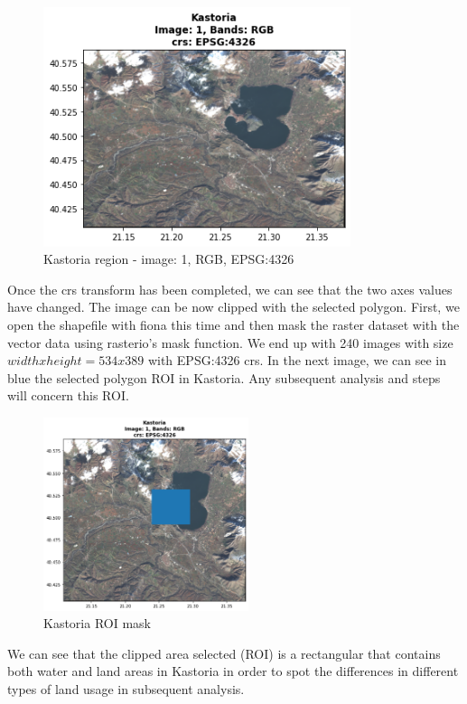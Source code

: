 \begin{figure}[h]
    \centering
    \includegraphics[height=7cm]{figures/q2_1_rasterio_image1_rgb_image_new_crs.png}
    \caption{Kastoria region - image: 1, RGB, EPSG:4326}
    \label{fig:Kastoria region - image: 1, RGB, EPSG:4326}
\end{figure}
\FloatBarrier %

Once the crs transform has been completed, we can see that the two axes values have changed. The image can be now clipped with the selected polygon. First, we open the shapefile with fiona this time and then mask the raster dataset with the vector data using rasterio's mask function. We end up with 240 images with size $width x height = 534 x 389 $ with EPSG:4326 crs. In the next image, we can see in blue the selected polygon ROI in Kastoria. Any subsequent analysis and steps will concern this ROI.

\begin{figure}[h]
    \centering
    \includegraphics[width=6cm]{figures/q2_2_mask_ROI.png}
    \caption{Kastoria ROI mask}
    \label{fig:Kastoria ROI mask}
\end{figure}
\FloatBarrier %

We can see that the clipped area selected (ROI) is a rectangular that contains both water and land areas in Kastoria in order to spot the differences in different types of land usage in subsequent analysis.

